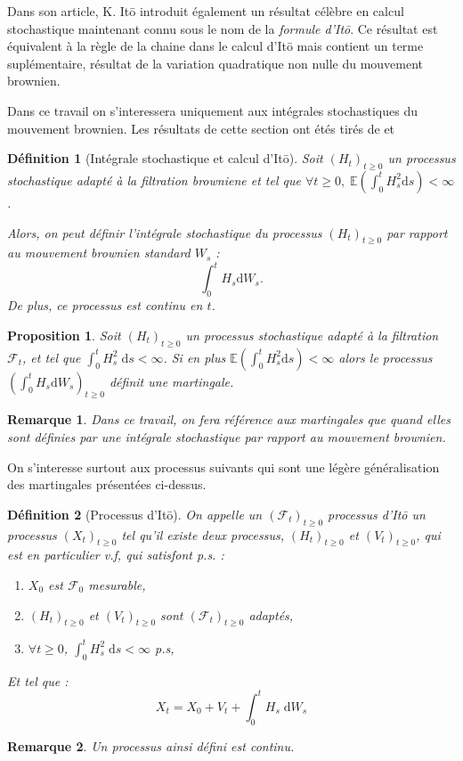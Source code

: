 \documentclass[openany]{book}
\newcommand{\F}{\mathscr{F}}
\newcommand{\E}{\mathbb{E}}
\newcommand{\1}{\mathbbm{1}}
\renewcommand{\d}{\mathrm{d}}
\theoremstyle{thmfont}
\theoremstyle{deffont}
\newtheorem{definition}[definition]{Définition}
\theoremstyle{thmfont}
\newtheorem{prop}[prop]{Proposition}
\theoremstyle{deffont}
\newtheorem{remark}[remark]{Remarque}
\begin{document}
Dans son article, K. Itō introduit également un résultat célèbre en calcul stochastique maintenant connu sous le nom de la \textit{formule d'Itō}. Ce résultat est équivalent à la règle de la chaine dans le calcul d'Itō mais contient un terme suplémentaire, résultat de la variation quadratique non nulle du mouvement brownien.

Dans ce travail on s'interessera uniquement aux intégrales stochastiques du mouvement brownien. Les résultats de cette section ont étés tirés de \cite{russo} et \cite{fournier}%

\begin{definition}[Intégrale stochastique et calcul d'Itō]
  Soit $(H_t)_{t \geq 0}$ un processus stochastique adapté à la filtration browniene et tel que $\forall t \geq 0, \; \E \left(\int_0^t H_s^2 \d s\right) < \infty$.

  Alors, on peut définir \textit{l'intégrale stochastique} du processus $(H_t)_{t\geq0}$ par rapport au mouvement brownien standard $W_s$ :
  $$ \int_0^t H_s \d W_s.$$
  De plus, ce processus est continu en $t$.
\end{definition}


\begin{prop} Soit $(H_t)_{t \geq 0}$ un processus stochastique adapté à la filtration  $\F_t$, et tel que $\int_0^t H_s^2\;\d s < \infty$. Si en plus $\E\left(\int_0^tH_s^2 \d s\right) < \infty$ alors le processus $(\int_0^t H_s \d W_s)_{t\geq 0}$ définit une martingale. 
\end{prop}

\begin{remark}
  Dans ce travail, on fera référence aux martingales que quand elles sont définies par une intégrale stochastique par rapport au mouvement brownien.
\end{remark}

On s'interesse surtout aux processus suivants qui sont une légère généralisation des martingales présentées ci-dessus.
\begin{definition}[Processus d'Itō] On appelle un $(\F_t)_{t\geq0}$ \textit{processus d'Itō} un processus $(X_t)_{t\geq0}$ tel qu'il existe deux processus, $(H_t)_{t\geq0}$ et $(V_t)_{t\geq 0}$, qui est en particulier v.f, qui satisfont p.s. :
  \begin{enumerate}
  \item $X_0$ est $\F_0$ mesurable,
  \item $(H_t)_{t\geq0}$ et $(V_t)_{t\geq0}$ sont $(\F_t)_{t\geq0}$ adaptés,
  \item $\forall t \geq 0$, $\int_0^t H_s^2\;\d s < \infty$ p.s,
    \end{enumerate}

    Et tel que :
   $$X_t = X_0 + V_t + \int_0^t H_s \;\d W_s$$
 \end{definition}
 \begin{remark}
   \label{rmk:ContinuitePrIto}
   Un processus ainsi défini est continu.
 \end{remark}
 
\end{document}
